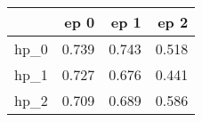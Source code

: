 \begin{tabular}{lrrr}
\toprule
{} &   ep 0 &   ep 1 &   ep 2 \\
\midrule
hp\_0 &  0.739 &  0.743 &  0.518 \\
hp\_1 &  0.727 &  0.676 &  0.441 \\
hp\_2 &  0.709 &  0.689 &  0.586 \\
\bottomrule
\end{tabular}
